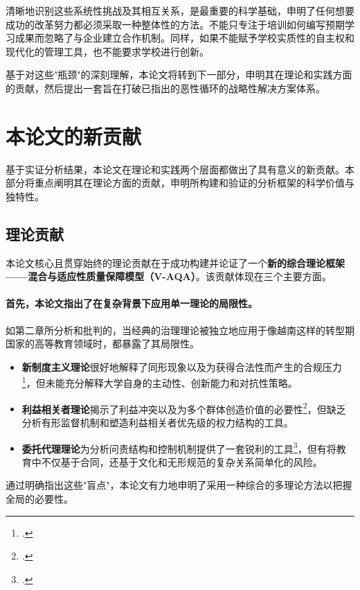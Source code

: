 清晰地识别这些系统性挑战及其相互关系，是最重要的科学基础，申明了任何想要成功的改革努力都必须采取一种整体性的方法。不能只专注于培训如何编写预期学习成果而忽略了与企业建立合作机制。同样，如果不能赋予学校实质性的自主权和现代化的管理工具，也不能要求学校进行创新。

基于对这些"瓶颈"的深刻理解，本论文将转到下一部分，申明其在理论和实践方面的贡献，然后提出一套旨在打破已指出的恶性循环的战略性解决方案体系。




\section{本论文的新贡献}
\label{sec:dong_gop_luan_an}

基于实证分析结果，本论文在理论和实践两个层面都做出了具有意义的新贡献。本部分将重点阐明其在理论方面的贡献，申明所构建和验证的分析框架的科学价值与独特性。

\subsection{理论贡献}
\label{subsec:dong_gop_ly_luan}

本论文核心且贯穿始终的理论贡献在于成功构建并论证了一个\textbf{新的综合理论框架——混合与适应性质量保障模型（V-AQA）}。该贡献体现在三个主要方面。

\paragraph{首先，本论文指出了在复杂背景下应用单一理论的局限性。}
如第二章所分析和批判的，当经典的治理理论被独立地应用于像越南这样的转型期国家的高等教育领域时，都暴露了其局限性。
\begin{itemize}
    \item \textbf{新制度主义理论}很好地解释了同形现象以及为获得合法性而产生的合规压力\footcite{MeyerPowell2020}，但未能充分解释大学自身的主动性、创新能力和对抗性策略。
    \item \textbf{利益相关者理论}揭示了利益冲突以及为多个群体创造价值的必要性\footcite{Freeman1984}，但缺乏分析有形监督机制和塑造利益相关者优先级的权力结构的工具。
    \item \textbf{委托代理理论}为分析问责结构和控制机制提供了一套锐利的工具\footcite{JensenMeckling1976}，但有将教育中不仅基于合同，还基于文化和无形规范的复杂关系简单化的风险。
\end{itemize}
通过明确指出这些"盲点"，本论文有力地申明了采用一种综合的多理论方法以把握全局的必要性。

